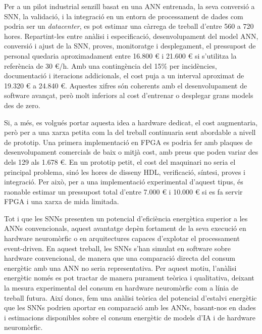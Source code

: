 \documentclass[a4paper,11pt, titlepage, twoside]{article}
\begin{document}
Per a un pilot industrial senzill basat en una ANN entrenada, la seva conversió a SNN, la validació, i la integració en un entorn de processament de dades com podria ser un \textit{datacenter}, es pot estimar una càrrega de treball d'entre 560 a 720 hores. Repartint-les entre anàlisi i especificació, desenvolupament del model ANN, conversió i ajust de la SNN, proves, monitoratge i desplegament, el pressupost de personal quedaria aproximadament entre 16.800 € i 21.600 € si s'utilitza la referència de 30 €/h. Amb una contingència del 15\% per incidències, documentació i iteracions addicionals, el cost puja a un interval aproximat de 19.320 € a 24.840 €. Aquestes xifres són coherents amb el desenvolupament de software avançat, però molt inferiors al cost d'entrenar o desplegar grans models des de zero.

Si, a més, es volgués portar aquesta idea a hardware dedicat, el cost augmentaria, però per a una xarxa petita com la del treball continuaria sent abordable a nivell de prototip. Una primera implementació en FPGA es podria fer amb plaques de desenvolupament comercials de baix o mitjà cost, amb preus que poden variar des dels 129 als 1.678 €. En un prototip petit, el cost del maquinari no seria el principal problema, sinó les hores de disseny HDL, verificació, síntesi, proves i integració. Per això, per a una implementació experimental d'aquest tipus, és raonable estimar un pressupost total d'entre 7.000 € i 10.000 € si es fa servir FPGA i una xarxa de mida limitada.

Tot i que les SNNs presenten un potencial d’eficiència energètica superior a les ANNs convencionals, aquest avantatge depèn fortament de la seva execució en hardware neuromòrfic o en arquitectures capaces d’explotar el processament event-driven. En aquest treball, les SNNs s’han simulat en software sobre hardware convencional, de manera que una comparació directa del consum energètic amb una ANN no seria representativa. Per aquest motiu, l’anàlisi energètic només es pot tractar de manera purament teòrica i qualitativa, deixant la mesura experimental del consum en hardware neuromòrfic com a línia de treball futura. Així doncs, fem una anàlisi teòrica del potencial d’estalvi energètic que les SNNs podrien aportar en comparació amb les ANNs, basant-nos en dades i estimacions disponibles sobre el consum energètic de models d’IA i de hardware neuromòrfic.
\end{document}

